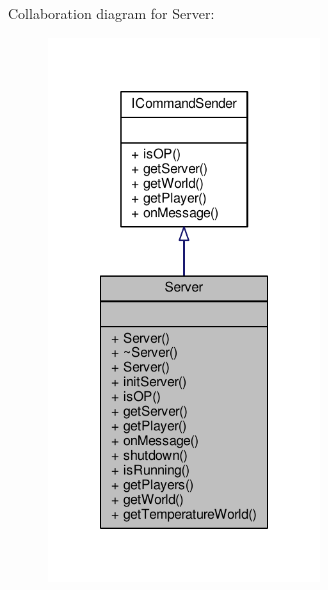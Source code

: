 Collaboration diagram for Server\-:
\nopagebreak
\begin{figure}[H]
\begin{center}
\leavevmode
\includegraphics[width=204pt]{class_server__coll__graph}
\end{center}
\end{figure}
